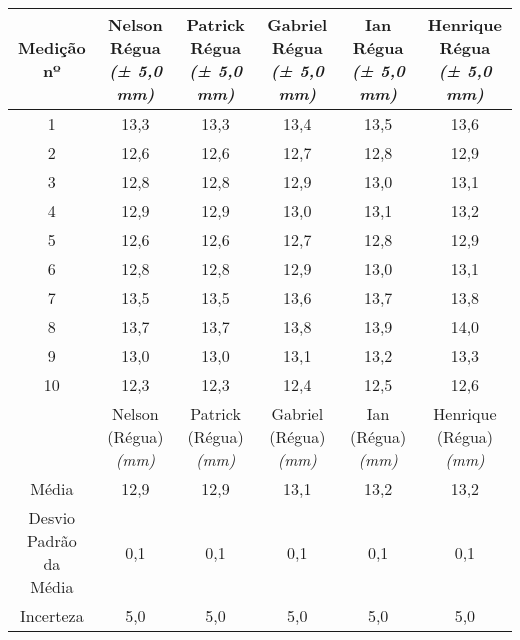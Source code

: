 \documentclass{article}
\begin{document}
\begin{table}[h!]
\centering
\begin{tabular}{c c c c c c }
\toprule
Medição nº & \shortstack{Nelson\\Régua\\\textit{(± 5,0 mm)}} & \shortstack{Patrick\\Régua\\\textit{(± 5,0 mm)}} & \shortstack{Gabriel\\Régua\\\textit{(± 5,0 mm)}} & \shortstack{Ian\\Régua\\\textit{(± 5,0 mm)}} & \shortstack{Henrique\\Régua\\\textit{(± 5,0 mm)}}\\
\midrule
1 & 13,3 & 13,3 & 13,4 & 13,5 & 13,6\\
2 & 12,6 & 12,6 & 12,7 & 12,8 & 12,9\\
3 & 12,8 & 12,8 & 12,9 & 13,0 & 13,1\\
4 & 12,9 & 12,9 & 13,0 & 13,1 & 13,2\\
5 & 12,6 & 12,6 & 12,7 & 12,8 & 12,9\\
6 & 12,8 & 12,8 & 12,9 & 13,0 & 13,1\\
7 & 13,5 & 13,5 & 13,6 & 13,7 & 13,8\\
8 & 13,7 & 13,7 & 13,8 & 13,9 & 14,0\\
9 & 13,0 & 13,0 & 13,1 & 13,2 & 13,3\\
10 & 12,3 & 12,3 & 12,4 & 12,5 & 12,6\\
\midrule
&\shortstack{Nelson\\(Régua)\\\textit{(mm)}} & \shortstack{Patrick\\(Régua)\\\textit{(mm)}} & \shortstack{Gabriel\\(Régua)\\\textit{(mm)}} & \shortstack{Ian\\(Régua)\\\textit{(mm)}} & \shortstack{Henrique\\(Régua)\\\textit{(mm)}}\\
\midrule
Média & 12,9 & 12,9 & 13,1 & 13,2 & 13,2\\[3pt]
\shortstack{Desvio\\Padrão da\\Média} & 0,1 & 0,1 & 0,1 & 0,1 & 0,1\\[3pt]
Incerteza & 5,0 & 5,0 & 5,0 & 5,0 & 5,0\\
\bottomrule
\end{tabular}
\end{table}
\end{document}

